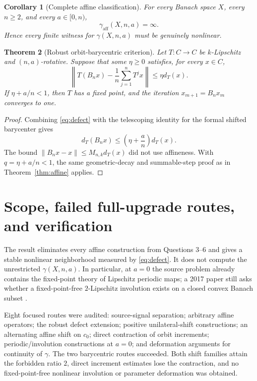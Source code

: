 \documentclass[11pt]{article}
\newtheorem{theorem}{Theorem}
\newtheorem{corollary}[theorem]{Corollary}
\begin{document}
\begin{corollary}[Complete affine classification]\label{cor:class}
For every Banach space $X$, every $n\geq2$, and every $a\in[0,n)$,
\[
 \gamma_{\mathrm{aff}}(X,n,a)=\infty.
\]
Hence every finite witness for $\gamma(X,n,a)$ must be genuinely nonlinear.
\end{corollary}

\begin{theorem}[Robust orbit-barycentric criterion]\label{thm:robust}
Let $T:C\to C$ be $k$-Lipschitz and $(n,a)$-rotative. Suppose that some
$\eta\geq0$ satisfies, for every $x\in C$,
\begin{equation}\label{eq:defect}
 \left\|T(B_nx)-\frac1n\sum_{j=1}^{n}T^jx\right\|
 \leq\eta d_T(x).
\end{equation}
If $\eta+a/n<1$, then $T$ has a fixed point, and the iteration
$x_{m+1}=B_nx_m$ converges to one.
\end{theorem}

\begin{proof}
Combining \eqref{eq:defect} with the telescoping identity for the formal shifted
barycenter gives
\[
 d_T(B_nx)\leq\left(\eta+\frac an\right)d_T(x).
\]
The bound $\|B_nx-x\|\leq M_{n,k}d_T(x)$ did not use affineness. With
$q=\eta+a/n<1$, the same geometric-decay and summable-step proof as in
Theorem~\ref{thm:affine} applies.
\end{proof}

\section{Scope, failed full-upgrade routes, and verification}

The result eliminates every affine construction from Questions 3--6 and gives a stable
nonlinear neighborhood measured by \eqref{eq:defect}. It does not compute the unrestricted
$\gamma(X,n,a)$. In particular, at $a=0$ the source problem already contains the
fixed-point theory of Lipschitz periodic maps; a 2017 paper still asks whether a
fixed-point-free $2$-Lipschitz involution exists on a closed convex Banach subset
\cite[Question~4.2]{Gornicki17}.

Eight focused routes were audited: source-signal separation; arbitrary affine operators;
the robust defect extension; positive unilateral-shift constructions; an alternating
affine shift on $c_0$; direct contraction of orbit increments; periodic/involution
constructions at $a=0$; and deformation arguments for continuity of $\gamma$. The two
barycentric routes succeeded. Both shift families attain the forbidden ratio $2$, direct
increment estimates lose the contraction, and no fixed-point-free nonlinear involution or
parameter deformation was obtained.
\end{document}
